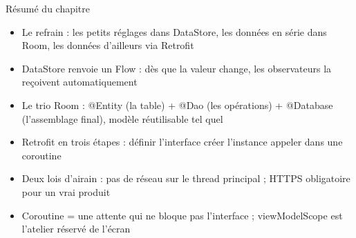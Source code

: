 \begin{tcbsummary}{Résumé du chapitre}
\begin{itemize}
  \item Le refrain : les petits réglages dans DataStore, les données en série dans Room, les données d'ailleurs via Retrofit
  \item DataStore renvoie un Flow : dès que la valeur change, les observateurs la reçoivent automatiquement
  \item Le trio Room : @Entity (la table) + @Dao (les opérations) + @Database (l'assemblage final), modèle réutilisable tel quel
  \item Retrofit en trois étapes : définir l'interface créer l'instance appeler dans une coroutine
  \item Deux lois d'airain : pas de réseau sur le thread principal ; HTTPS obligatoire pour un vrai produit
  \item Coroutine = une attente qui ne bloque pas l'interface ; viewModelScope est l'atelier réservé de l'écran
\end{itemize}

\end{tcbsummary}
